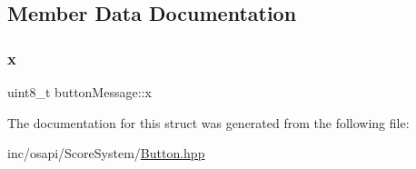 \subsection{Member Data Documentation}
\mbox{\label{structbutton_message_a60b6978886b39350eadfe902d83eb7ad}} 
\subsubsection{\texorpdfstring{x}{x}}
{\footnotesize\ttfamily uint8\+\_\+t button\+Message\+::x}



The documentation for this struct was generated from the following file\+:\begin{DoxyCompactItemize}
\item 
inc/osapi/\+Score\+System/\hyperlink{_button_8hpp}{Button.\+hpp}\end{DoxyCompactItemize}
